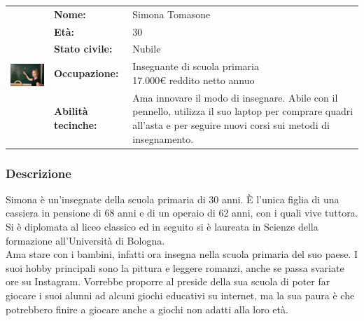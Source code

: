 \documentclass[../Report.tex]{subfiles}
\begin{document}
    \begin{table}[H]
        \begin{tabular}{|c|l|p{7cm}|}
            \hline
            \multirow{5}{*}{\includegraphics[width=5cm, height=5cm]{Simona.jpg}} 
                & \textbf{Nome:} & Simona Tomasone\\ \cmidrule{2-3}
            & \textbf{Età:} & 30 \\ \cmidrule{2-3}
            & \textbf{Stato civile:} & Nubile \\ \cmidrule{2-3}
            & \textbf{Occupazione:} & \makecell{Insegnante di scuola primaria \\ 17.000€ reddito netto annuo} \\ \cmidrule{2-3}
            & \textbf{Abilità tecinche:} &  Ama innovare il modo di insegnare. Abile con il pennello, utilizza il suo laptop per comprare quadri all'asta e per seguire nuovi corsi sui metodi di insegnamento.\\
            \hline
        \end{tabular}
    \end{table}

    \subsubsection{Descrizione}
    Simona è un'insegnate della scuola primaria di 30 anni. È l'unica figlia di una cassiera in pensione di 68 anni e di un operaio di 62 anni, con i quali vive tuttora. Si è diplomata al liceo classico ed in seguito si è laureata in Scienze della formazione all'Università di Bologna.\\
    Ama stare con i bambini, infatti ora insegna nella scuola primaria del suo paese. I suoi hobby principali sono la pittura e leggere romanzi, anche se passa svariate ore su Instagram. Vorrebbe proporre al preside della sua scuola di poter far giocare i suoi alunni ad alcuni giochi educativi su internet, ma la sua paura è che potrebbero finire a giocare anche a giochi non adatti alla loro età.
\end{document}
